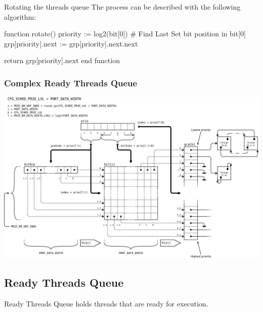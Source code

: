 \begin{DoxyParagraph}{Rotating the threads queue}
The process can be described with the following algorithm\-: 
\begin{DoxyCode}
\textcolor{keyword}{function} rotate()
    priority := log2(bit[0])                                \textcolor{preprocessor}{# Find Last Set bit position in bit[0]}
\textcolor{preprocessor}{}
    grp[priority].next := grp[priority].next.next
    
    \textcolor{keywordflow}{return} grp[priority].next
end \textcolor{keyword}{function}
\end{DoxyCode}
 
\end{DoxyParagraph}
\hypertarget{scheduler_sched_rdyThdQ_complex}{}\subsubsection{Complex Ready Threads Queue}\label{scheduler_sched_rdyThdQ_complex}

\begin{DoxyImage}
\includegraphics[width=17cm]{thdQ-complex.png}
\caption{Ready Threads Queue -\/ high number of priority levels}
\end{DoxyImage}
\hypertarget{scheduler_sched_rdyThdQ}{}\subsection{Ready Threads Queue}\label{scheduler_sched_rdyThdQ}
Ready Threads Queue holds threads that are ready for execution. 